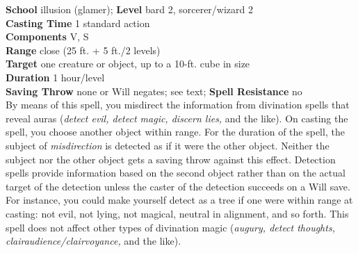 \textbf{School} illusion (glamer); \textbf{Level} bard 2, sorcerer/wizard 2\\
\textbf{Casting Time} 1 standard action\\
\textbf{Components} V, S\\
\textbf{Range} close (25 ft. + 5 ft./2 levels)\\
\textbf{Target} one creature or object, up to a 10-ft. cube in size\\
\textbf{Duration} 1 hour/level\\
\textbf{Saving Throw} none or Will negates; see text; \textbf{Spell Resistance} no\\
By means of this spell, you misdirect the information from divination spells that reveal auras (\textit{detect evil, detect magic, discern lies, }and the like). On casting the spell, you choose another object within range. For the duration of the spell, the subject of \textit{misdirection }is detected as if it were the other object. Neither the subject nor the other object gets a saving throw against this effect. Detection spells provide information based on the second object rather than on the actual target of the detection unless the caster of the detection succeeds on a Will save. For instance, you could make yourself detect as a tree if one were within range at casting: not evil, not lying, not magical, neutral in alignment, and so forth. This spell does not affect other types of divination magic (\textit{augury, detect thoughts, clairaudience/clairvoyance, }and the like).\\
